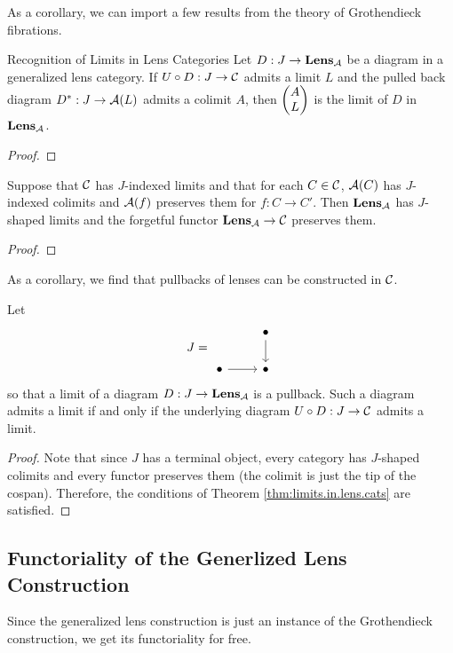 As a corollary, we can import a few results from the theory of Grothendieck
fibrations.
\begin{thm}{Recognition of Limits in Lens Categories}\label{thm:limits.in.lens.cats}
Let $D : J \to \textbf{Lens}_{\operatorname{\mathcal{A}}}$ be a diagram in a generalized lens category.
If $U \circ D : J \to \operatorname{\mathcal{C}}$ admits a limit $L$ and the pulled back diagram
$D^{\ast} : J \to \operatorname{\mathcal{A}}(L)$ admits a colimit $A$, then $\begin{pmatrix}{A} \\ {L} \end{pmatrix}$ is the limit
of $D$ in $\textbf{Lens}_{\operatorname{\mathcal{A}}}$.
\end{thm}
\begin{proof}

\end{proof}

\begin{cor}
Suppose that $\operatorname{\mathcal{C}}$ has $J$-indexed limits and that for each $C \in \operatorname{\mathcal{C}}$,
$\operatorname{\mathcal{A}}(C)$ has $J$-indexed colimits and $\operatorname{\mathcal{A}}(f)$ preserves them for $f : C \to
C'$. Then $\textbf{Lens}_{\operatorname{\mathcal{A}}}$ has $J$-shaped limits and the forgetful functor
$\textbf{Lens}_{\operatorname{\mathcal{A}}} \to \operatorname{\mathcal{C}}$ preserves them.
\end{cor}
\begin{proof}

\end{proof}

As a corollary, we find that pullbacks of lenses can be constructed in $\operatorname{\mathcal{C}}$.
\begin{cor}
Let \[J = \begin{tikzcd} & \bullet \arrow[d] \\ \bullet \arrow[r] &
  \bullet \end{tikzcd}\]
so that a limit of a diagram $D : J \to \textbf{Lens}_{\operatorname{\mathcal{A}}}$ is a pullback. Such
a diagram admits a limit if and only if the underlying diagram $U \circ D : J
\to \operatorname{\mathcal{C}}$ admits a limit. 
\end{cor}
\begin{proof}
Note that since $J$ has a terminal object, every category has $J$-shaped colimits and every functor
preserves them (the colimit is just the tip of the cospan). Therefore, the
conditions of Theorem \ref{thm:limits.in.lens.cats} are satisfied.
\end{proof}

\subsection{Functoriality of the Generlized Lens Construction}

Since the generalized lens construction is just an instance of the Grothendieck
construction, we get its functoriality for free.

